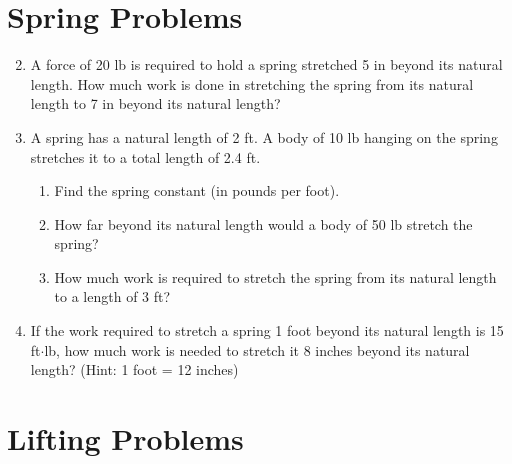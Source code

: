 \documentclass[12pt]{article}
\newif\ifans
\begin{document}
\section*{Spring Problems}

\begin{enumerate}
\setcounter{enumi}{1}

\item A force of 20 lb is required to hold a spring stretched 5 in beyond its natural length.  How much work is done in stretching the spring from its natural length to 7 in beyond its natural length?

\ifans{\fbox{$98 \text{ in}\cdot\text{lb}=\frac{49}{6} \text{ ft}\cdot\text{lb}$ }} \fi

\item A spring has a natural length of 2 ft.  A body of 10 lb hanging on the spring stretches it to a total length of 2.4 ft.

\begin{enumerate}

\item Find the spring constant (in pounds per foot).

\ifans{\fbox{$F(x)=kx$, where $k=25$}} \fi

\item  How far beyond its natural length would a body of 50 lb stretch the spring?

\ifans{\fbox{The spring will stretch 2 ft beyond its natural length to a total length of 4 ft.}} \fi

\item How much work is required to stretch the spring from its natural length to a length of 3 ft?

\ifans{\fbox{$\frac{25}{2} \text{ ft}\cdot\text{lb}$; Detailed Solution: \textcolor{blue}{\href{http://www.math.drexel.edu/classes/Calculus/resources/Math122HW/Solutions/122_10_Work_03.pdf}{Here}}}} \fi

\end{enumerate}

\item If the work required to stretch a spring 1 foot beyond its natural length is 15 ft$\cdot$lb, how much work is needed to stretch it 8 inches beyond its natural length? (Hint: 1 foot = 12 inches)

\ifans{\fbox{$\frac{20}{3} \text{ ft}\cdot\text{lb}$}} \fi

\end{enumerate}

\section*{Lifting Problems}
\end{document}
